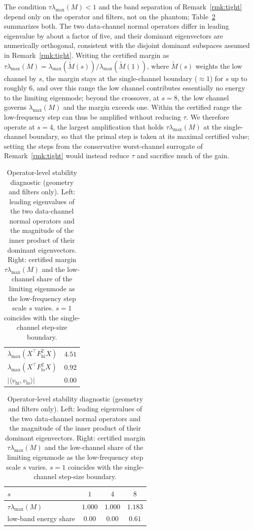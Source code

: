 \documentclass{article}
\begin{document}
The condition $\tau\lambda_{\max}(M)<1$ and the band separation of Remark~\ref{rmk:tight} depend only on the operator and filters, not on the phantom; Table~\ref{tab:stability} summarizes both. The two data-channel normal operators differ in leading eigenvalue by about a factor of five, and their dominant eigenvectors are numerically orthogonal, consistent with the disjoint dominant subspaces assumed in Remark~\ref{rmk:tight}. Writing the certified margin as $\tau\lambda_{\max}(M)=\lambda_{\max}(\widetilde M(s))/\lambda_{\max}(\widetilde M(1))$, where $\widetilde M(s)$ weights the low channel by $s$, the margin stays at the single-channel boundary ($\approx 1$) for $s$ up to roughly $6$, and over this range the low channel contributes essentially no energy to the limiting eigenmode; beyond the crossover, at $s=8$, the low channel governs $\lambda_{\max}(M)$ and the margin exceeds one. Within the certified range the low-frequency step can thus be amplified without reducing $\tau$. We therefore operate at $s=4$, the largest amplification that holds $\tau\lambda_{\max}(M)$ at the single-channel boundary, so that the primal step is taken at its maximal certified value; setting the steps from the conservative worst-channel surrogate of Remark~\ref{rmk:tight} would instead reduce $\tau$ and sacrifice much of the gain.

\begin{table}[t]
\centering
\caption{Operator-level stability diagnostic (geometry and filters only). Left: leading eigenvalues of the two data-channel normal operators and the magnitude of the inner product of their dominant eigenvectors. Right: certified margin $\tau\lambda_{\max}(M)$ and the low-channel share of the limiting eigenmode as the low-frequency step scale $s$ varies. $s=1$ coincides with the single-channel step-size boundary.}
\label{tab:stability}
\begin{tabular}{lc}
\toprule
$\lambda_{\max}(X^\top F_{\mathrm{hi}}^2 X)$ & $4.51$\\
$\lambda_{\max}(X^\top F_{\mathrm{lo}}^2 X)$ & $0.92$\\
$|\langle v_{\mathrm{hi}},v_{\mathrm{lo}}\rangle|$ & $0.00$\\
\bottomrule
\end{tabular}
\qquad
\begin{tabular}{lccc}
\toprule
$s$ & $1$ & $4$ & $8$\\
\midrule
$\tau\lambda_{\max}(M)$ & $1.000$ & $1.000$ & $1.183$\\
low-band energy share & $0.00$ & $0.00$ & $0.61$\\
\bottomrule
\end{tabular}
\end{table}
\end{document}
